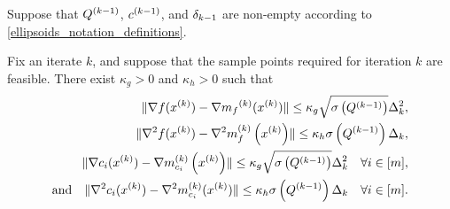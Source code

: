 \begin{lemma}
\label{accuracy_is_satisfied_lemma}
Suppose that ${Q^{(k-1)}}$, ${c^{(k-1)}}$, and ${\delta_{k-1}}$ are non-empty according to \cref{ellipsoids_notation_definitions}.



Fix an iterate $k$, and suppose that the sample points required for iteration $k$ are feasible.
There exist $\kappa_g>0$ and $\kappa_h>0$ such that
\begin{align*}
\|\nabla f(x^{(k)}) - \nabla {{m}_f}^{(k)}(x^{(k)}) \| \le \kappa_g \sqrt{{\sigma} \left({Q^{(k-1)}}\right)} \Delta_k^2, \\
\|\nabla^2 f(x^{(k)}) - {\nabla^2m_f^{(k)}\left(x^{(k)}\right)} \| \le \kappa_h {\sigma} \left({Q^{(k-1)}}\right) \Delta_k,  \\
\|\nabla c_i(x^{(k)}) - {\nabla m_{c_i}^{(k)}\left(x^{(k)}\right)} \| \le \kappa_g \sqrt{{\sigma} \left({Q^{(k-1)}}\right)} \Delta_k^2 \quad \forall i \in [m],\\
\textrm{and} \quad \|\nabla^2 c_i(x^{(k)}) - \nabla^2 m_{c_i}^{(k)}(x^{(k)}) \| \le \kappa_h {\sigma} \left({Q^{(k-1)}}\right) \Delta_k \quad \forall i \in [m]. \\
\end{align*}
\end{lemma}

